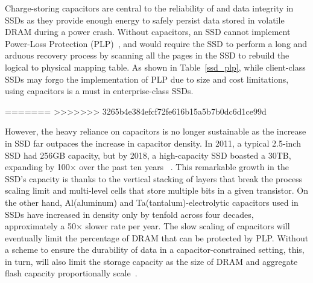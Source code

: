 Charge-storing capacitors are central to the reliability of and data integrity in SSDs 
as they provide enough energy to safely persist data stored in volatile DRAM during a power crash. 
Without capacitors, an SSD cannot implement Power-Loss Protection (PLP)~\cite{micron2014, intel2014, samsungplp2016}, 
and would require the SSD to perform a long and arduous recovery process by scanning all the pages in the SSD to rebuild the logical to physical mapping table. 
As shown in Table~\ref{ssd_plp}, 
while client-class SSDs may forgo the implementation of PLP due to size and cost limitations, 
using capacitors is a must in enterprise-class SSDs. 

=======
>>>>>>> 3265b4e384efcf72fe616b15a5b7b0dc6d1ce99d


However, the heavy reliance on capacitors is no longer sustainable as the increase in SSD far outpaces 
the increase in capacitor density.
In 2011, a typical 2.5-inch SSD had 256GB capacity, but
by 2018, a high-capacity SSD boasted a 30TB, expanding by 100$\times$ over the past ten years
~\cite{samsung2011, anandtech18samsung}. 
This remarkable growth in the SSD's capacity is thanks to the vertical stacking of layers that break the process scaling limit and multi-level cells that store multiple bits in a given transistor.
On the other hand, Al(aluminum) and Ta(tantalum)-electrolytic capacitors used in SSDs 
have increased in density only by tenfold across four decades,
approximately a 50$\times$ slower rate per year. 
The slow scaling of capacitors will eventually limit the percentage of DRAM that can be protected by PLP.
Without a scheme to ensure the durability of data in a capacitor-constrained setting, 
this, in turn, will also limit the storage capacity as the size of DRAM and aggregate flash capacity proportionally scale~\cite{ni2017hash}. 

